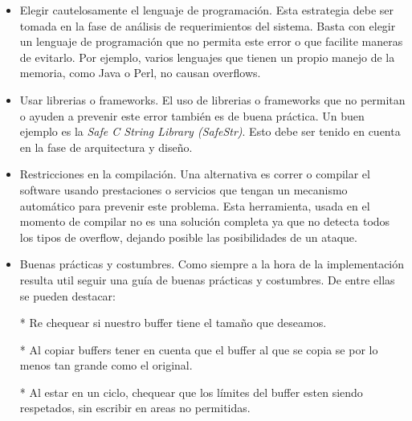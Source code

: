 \begin{itemize}
    \item Elegir cautelosamente el lenguaje de programación. Esta estrategia debe ser tomada en la fase de análisis de requerimientos del sistema.
	Basta con elegir un lenguaje de programación que no permita este error o que facilite maneras de evitarlo.
	Por ejemplo, varios lenguajes que tienen un propio manejo de la memoria, como Java o Perl, no causan overflows.
    \item Usar librerias o frameworks. 
	El uso de librerias o frameworks que no permitan o ayuden a prevenir este error también es de buena práctica.
	Un buen ejemplo es la \textit{Safe C String Library (SafeStr)}.
	Esto debe ser tenido en cuenta en la fase de arquitectura y diseño.
    \item Restricciones en la compilación.
	Una alternativa es correr o compilar el software usando prestaciones o servicios que tengan un mecanismo automático para prevenir este problema.
	Esta herramienta, usada en el momento de compilar no es una solución completa ya que no detecta todos los tipos de overflow, dejando posible las posibilidades de un ataque.
    \item Buenas prácticas y costumbres.
	Como siempre a la hora de la implementación resulta util seguir una guía de buenas prácticas y costumbres.
	De entre ellas se pueden destacar:
	
	* Re chequear si nuestro buffer tiene el tamaño que deseamos.
	
	* Al copiar buffers tener en cuenta que el buffer al que se copia se por lo menos tan grande como el original.
	
	* Al estar en un ciclo, chequear que los límites del buffer esten siendo respetados, sin escribir en areas no permitidas.
	

\end{itemize}
